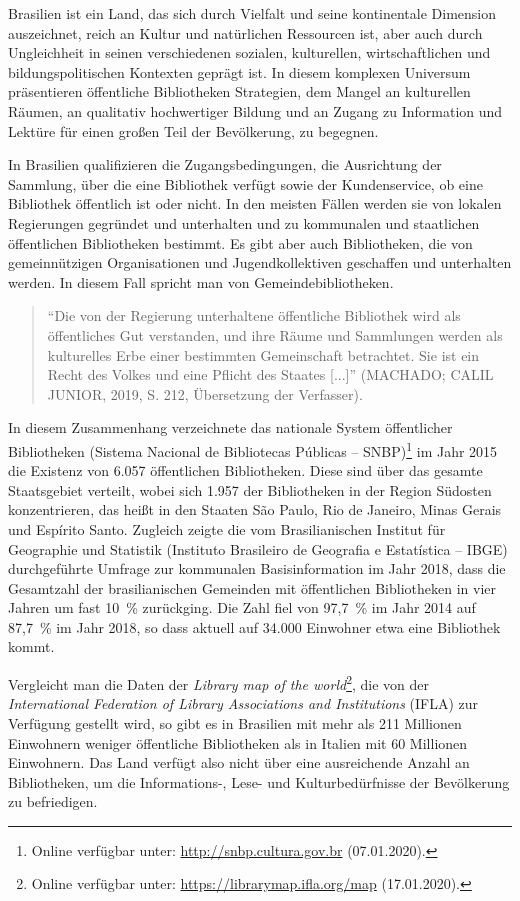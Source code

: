 \documentclass[a4paper,
fontsize=11pt,
oneside,
numbers=noperiodatend,
parskip=half-,
bibliography=totoc,
final
]{scrartcl}
\begin{document}
Brasilien ist ein Land, das sich durch Vielfalt und seine kontinentale
Dimension auszeichnet, reich an Kultur und natürlichen Ressourcen ist,
aber auch durch Ungleichheit in seinen verschiedenen sozialen,
kulturellen, wirtschaftlichen und bildungspolitischen Kontexten geprägt
ist. In diesem komplexen Universum präsentieren öffentliche Bibliotheken
Strategien, dem Mangel an kulturellen Räumen, an qualitativ hochwertiger
Bildung und an Zugang zu Information und Lektüre für einen großen Teil
der Bevölkerung, zu begegnen.

In Brasilien qualifizieren die Zugangsbedingungen, die Ausrichtung der
Sammlung, über die eine Bibliothek verfügt sowie der Kundenservice, ob
eine Bibliothek öffentlich ist oder nicht. In den meisten Fällen werden
sie von lokalen Regierungen gegründet und unterhalten und zu kommunalen
und staatlichen öffentlichen Bibliotheken bestimmt. Es gibt aber auch
Bibliotheken, die von gemeinnützigen Organisationen und
Jugendkollektiven geschaffen und unterhalten werden. In diesem Fall
spricht man von Gemeindebibliotheken.

\begin{quote}
\enquote{Die von der Regierung unterhaltene öffentliche Bibliothek wird
als öffentliches Gut verstanden, und ihre Räume und Sammlungen werden
als kulturelles Erbe einer bestimmten Gemeinschaft betrachtet. Sie ist
ein Recht des Volkes und eine Pflicht des Staates {[}...{]}} (MACHADO;
CALIL JUNIOR, 2019, S. 212, Übersetzung der Verfasser).
\end{quote}

In diesem Zusammenhang verzeichnete das nationale System öffentlicher
Bibliotheken (Sistema Nacional de Bibliotecas Públicas --
SNBP)\footnote{Online verfügbar unter: \url{http://snbp.cultura.gov.br}
  (07.01.2020).} im Jahr 2015 die Existenz von 6.057 öffentlichen
Bibliotheken. Diese sind über das gesamte Staatsgebiet verteilt, wobei
sich 1.957 der Bibliotheken in der Region Südosten konzentrieren, das
heißt in den Staaten São Paulo, Rio de Janeiro, Minas Gerais und
Espírito Santo. Zugleich zeigte die vom Brasilianischen Institut für
Geographie und Statistik (Instituto Brasileiro de Geografia e
Estatística -- IBGE) durchgeführte Umfrage zur kommunalen
Basisinformation im Jahr 2018, dass die Gesamtzahl der brasilianischen
Gemeinden mit öffentlichen Bibliotheken in vier Jahren um fast 10~\%
zurückging. Die Zahl fiel von 97,7~\% im Jahr 2014 auf 87,7~\% im Jahr
2018, so dass aktuell auf 34.000 Einwohner etwa eine Bibliothek kommt.

Vergleicht man die Daten der \emph{Library map of the world}\footnote{Online
  verfügbar unter: \url{https://librarymap.ifla.org/map} (17.01.2020).},
die von der \emph{International Federation of Library Associations and
Institutions} (IFLA) zur Verfügung gestellt wird, so gibt es in
Brasilien mit mehr als 211 Millionen Einwohnern weniger öffentliche
Bibliotheken als in Italien mit 60 Millionen Einwohnern. Das Land
verfügt also nicht über eine ausreichende Anzahl an Bibliotheken, um die
Informations-, Lese- und Kulturbedürfnisse der Bevölkerung zu
befriedigen.
\end{document}
